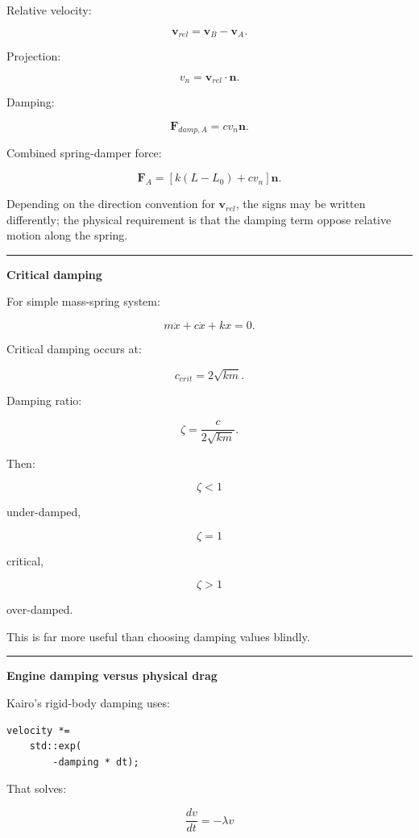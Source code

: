 Relative velocity:

\[
\mathbf{v}_{rel}
=
\mathbf{v}_B-\mathbf{v}_A.
\]

Projection:

\[
v_n
=
\mathbf{v}_{rel}\cdot\mathbf{n}.
\]

Damping:

\[
\mathbf{F}_{damp,A}
=
c v_n\mathbf{n}.
\]

Combined spring-damper force:

\[
\boxed{
\mathbf{F}_A
=
\left[
k(L-L_0)
+
cv_n
\right]\mathbf{n}.
}
\]

Depending on the direction convention for \(\mathbf{v}_{rel}\), the signs may be written differently; the physical requirement is that the damping term oppose relative motion along the spring.

\begin{center}\rule{0.5\linewidth}{0.5pt}\end{center}

\textbf{Critical damping}

For simple mass-spring system:

\[
m\ddot x+
c\dot x+
kx=0.
\]

Critical damping occurs at:

\[
\boxed{
c_{crit}
=
2\sqrt{km}.
}
\]

Damping ratio:

\[
\zeta
=
\frac{c}
{2\sqrt{km}}.
\]

Then:

\[
\zeta<1
\]

under-damped,

\[
\zeta=1
\]

critical,

\[
\zeta>1
\]

over-damped.

This is far more useful than choosing damping values blindly.

\begin{center}\rule{0.5\linewidth}{0.5pt}\end{center}

\textbf{Engine damping versus physical drag}

Kairo's rigid-body damping uses:

\begin{verbatim}
velocity *=
    std::exp(
        -damping * dt);
\end{verbatim}

That solves:

\[
\frac{dv}{dt}
=
-\lambda v
\]

